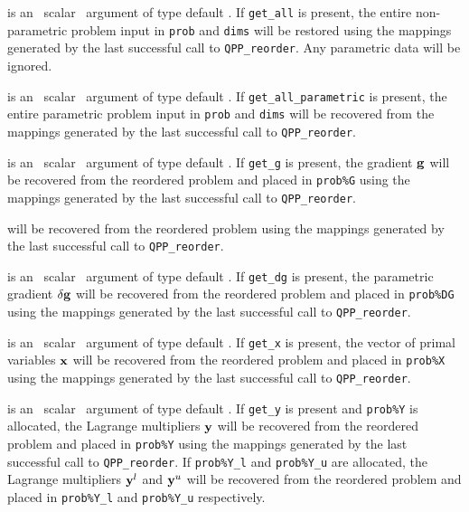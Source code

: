 \documentclass{galahad}
\newcommand{\packagename}{QPP}
\begin{document}
\begin{description}
is an \optional\ scalar \intentin\ argument of type default \logical. 
If {\tt get\_all} is present, the entire non-parametric problem 
input in {\tt prob} and {\tt dims} will be restored using the 
mappings generated by the last successful call to {\tt \packagename\_reorder}. 
Any parametric data will be ignored.

is an \optional\ scalar \intentin\ argument of type default \logical. 
If {\tt get\_all\_parametric} is present, the entire parametric problem 
input in {\tt prob} and {\tt dims} will be recovered from the 
mappings generated by the last successful call to {\tt \packagename\_reorder}. 
 
is an \optional\ scalar \intentin\ argument of type default \logical. 
If {\tt get\_g} is present, the gradient ${\mathbf{g}}$
will be recovered from  the reordered problem and placed in {\tt prob\%G} 
using the mappings generated by the last successful call to 
{\tt \packagename\_reorder}. 

will be recovered from  the reordered problem using the 
mappings generated by the last successful call to {\tt \packagename\_reorder}. 
 
is an \optional\ scalar \intentin\ argument of type default \logical. 
If {\tt get\_dg} is present, the parametric gradient $\delta {\mathbf{g}}$
will be recovered from  the reordered problem and placed in {\tt prob\%DG} 
using the mappings generated by the last successful call to 
{\tt \packagename\_reorder}. 
 
is an \optional\ scalar \intentin\ argument of type default \logical. 
If {\tt get\_x} is present, the vector of primal variables ${\mathbf{x}}$
will be recovered from  the reordered problem and placed in {\tt prob\%X} 
using the mappings generated by the last successful call to 
{\tt \packagename\_reorder}. 
 
is an \optional\ scalar \intentin\ argument of type default \logical. 
If {\tt get\_y} is present and {\tt prob\%Y} is allocated, 
the Lagrange multipliers 
${\mathbf{y}}$ will be recovered from  the reordered problem and placed in {\tt prob\%Y} 
using the mappings generated by the last successful call to 
{\tt \packagename\_reorder}. If {\tt prob\%Y\_l} and {\tt prob\%Y\_u} 
are allocated, the Lagrange multipliers 
${\mathbf{y}}^l$ and ${\mathbf{y}}^u$ will be recovered from  the reordered problem and 
placed in {\tt prob\%Y\_l} and {\tt prob\%Y\_u} respectively.
 

\end{description}
\end{document}
